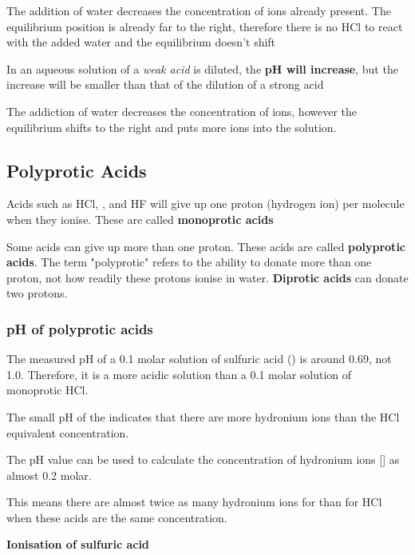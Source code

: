 		The addition of water decreases the concentration of  ions already present. The equilibrium position is already far to the right, therefore there is no HCl to react with the added water and the equilibrium doesn't shift

		

		In an aqueous solution of a \textit{weak acid} is diluted, the \textbf{pH will increase}, but the increase will be smaller than that of the dilution of a strong acid

		The addiction of water decreases the concentration of  ions, however the equilibrium shifts to the right and puts more  ions into the solution.

	\subsection{Polyprotic Acids}

		Acids such as HCl, , and HF will give up one proton (hydrogen ion) per molecule when they ionise. These are called \textbf{monoprotic acids}

		Some acids can give up more than one proton. These acids are called \textbf{polyprotic acids}. The term "polyprotic" refers to the ability to donate more than one proton, not how readily these protons ionise in water. \textbf{Diprotic acids} can donate two protons.

		\subsubsection{pH of polyprotic acids}
		
		The measured pH of a 0.1 molar solution of sulfuric acid () is around 0.69, not 1.0. Therefore, it is a more acidic solution than a 0.1 molar solution of monoprotic HCl.

		The small pH of the  indicates that there are more hydronium ions than the HCl equivalent concentration.

		The pH value can be used to calculate the concentration of hydronium ions [] as almost 0.2 molar.

		This means there are almost twice as many hydronium ions for  than for HCl when these acids are the same concentration.

		\textbf{Ionisation of sulfuric acid}

		\begin{center}
			 \\
		\end{center}
		
